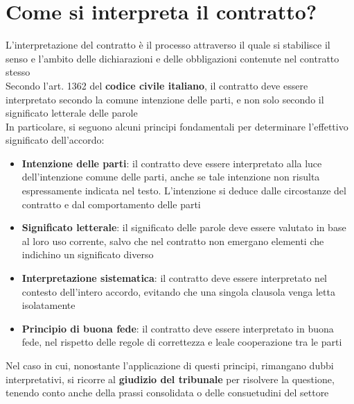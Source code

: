 \documentclass[8pt,oneside,a4paper]{article}
\begin{document}
	\section{Come si interpreta il contratto?}
	L'interpretazione del contratto è il processo attraverso il quale si stabilisce il senso e l'ambito delle dichiarazioni e delle obbligazioni contenute nel contratto stesso\\
	Secondo l'art. 1362 del \textbf{codice civile italiano}, il contratto deve essere interpretato secondo la comune intenzione delle parti, e non solo secondo il significato letterale delle parole\\
	In particolare, si seguono alcuni principi fondamentali per determinare l'effettivo significato dell'accordo:
	\begin{itemize}
		\item \textbf{Intenzione delle parti}: il contratto deve essere interpretato alla luce dell'intenzione comune delle parti, anche se tale intenzione non risulta espressamente indicata nel testo. L'intenzione si deduce dalle circostanze del contratto e dal comportamento delle parti
		\item \textbf{Significato letterale}: il significato delle parole deve essere valutato in base al loro uso corrente, salvo che nel contratto non emergano elementi che indichino un significato diverso
		\item \textbf{Interpretazione sistematica}: il contratto deve essere interpretato nel contesto dell’intero accordo, evitando che una singola clausola venga letta isolatamente
		\item \textbf{Principio di buona fede}: il contratto deve essere interpretato in buona fede, nel rispetto delle regole di correttezza e leale cooperazione tra le parti
	\end{itemize}
	Nel caso in cui, nonostante l’applicazione di questi principi, rimangano dubbi interpretativi, si ricorre al \textbf{giudizio del tribunale} per risolvere la questione, tenendo conto anche della prassi consolidata o delle consuetudini del settore
\end{document}
